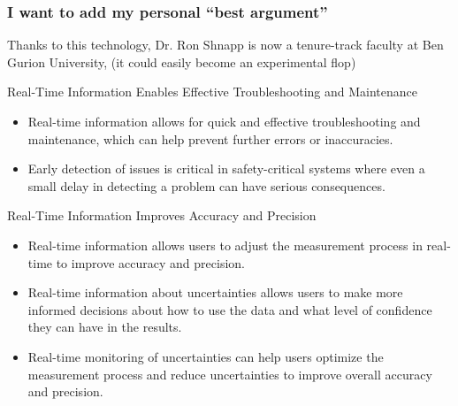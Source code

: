 \begin{frame}[label=intro]
\frametitle{I want to add my personal ``best argument''}
\begin{cardTiny}
Thanks to this technology, Dr. Ron Shnapp is now a tenure-track faculty at Ben Gurion University, (it could easily become an experimental flop)
\end{cardTiny}
\end{frame}





\begin{frame}{Real-Time Information Enables Effective Troubleshooting and Maintenance}

\begin{itemize}
\item Real-time information allows for quick and effective troubleshooting and maintenance, which can help prevent further errors or inaccuracies.
\item Early detection of issues is critical in safety-critical systems where even a small delay in detecting a problem can have serious consequences.
\end{itemize}

\end{frame}

\begin{frame}{Real-Time Information Improves Accuracy and Precision}

\begin{itemize}
\item Real-time information allows users to adjust the measurement process in real-time to improve accuracy and precision.
\item Real-time information about uncertainties allows users to make more informed decisions about how to use the data and what level of confidence they can have in the results.
\item Real-time monitoring of uncertainties can help users optimize the measurement process and reduce uncertainties to improve overall accuracy and precision.
\end{itemize}
\end{frame}

